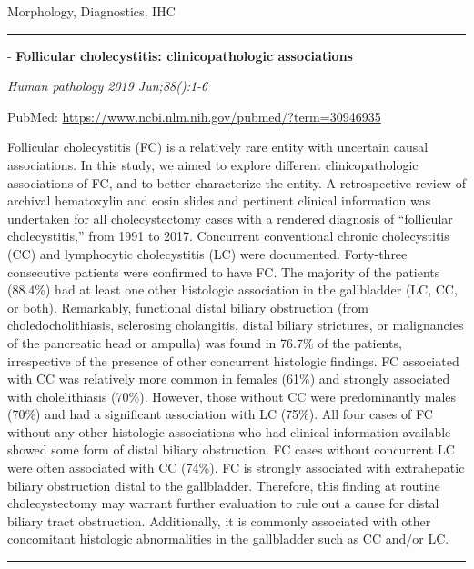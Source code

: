 \documentclass[]{article}
\begin{document}
Morphology, Diagnostics, IHC

\begin{center}\rule{0.5\linewidth}{\linethickness}\end{center}

 - \textbf{Follicular cholecystitis: clinicopathologic associations}

\emph{Human pathology 2019 Jun;88():1-6}

PubMed: \url{https://www.ncbi.nlm.nih.gov/pubmed/?term=30946935}

Follicular cholecystitis (FC) is a relatively rare entity with uncertain
causal associations. In this study, we aimed to explore different
clinicopathologic associations of FC, and to better characterize the
entity. A retrospective review of archival hematoxylin and eosin slides
and pertinent clinical information was undertaken for all
cholecystectomy cases with a rendered diagnosis of ``follicular
cholecystitis,'' from 1991 to 2017. Concurrent conventional chronic
cholecystitis (CC) and lymphocytic cholecystitis (LC) were documented.
Forty-three consecutive patients were confirmed to have FC. The majority
of the patients (88.4\%) had at least one other histologic association
in the gallbladder (LC, CC, or both). Remarkably, functional distal
biliary obstruction (from choledocholithiasis, sclerosing cholangitis,
distal biliary strictures, or malignancies of the pancreatic head or
ampulla) was found in 76.7\% of the patients, irrespective of the
presence of other concurrent histologic findings. FC associated with CC
was relatively more common in females (61\%) and strongly associated
with cholelithiasis (70\%). However, those without CC were predominantly
males (70\%) and had a significant association with LC (75\%). All four
cases of FC without any other histologic associations who had clinical
information available showed some form of distal biliary obstruction. FC
cases without concurrent LC were often associated with CC (74\%). FC is
strongly associated with extrahepatic biliary obstruction distal to the
gallbladder. Therefore, this finding at routine cholecystectomy may
warrant further evaluation to rule out a cause for distal biliary tract
obstruction. Additionally, it is commonly associated with other
concomitant histologic abnormalities in the gallbladder such as CC
and/or LC.

{}

{}

\begin{center}\rule{0.5\linewidth}{\linethickness}\end{center}
\end{document}
